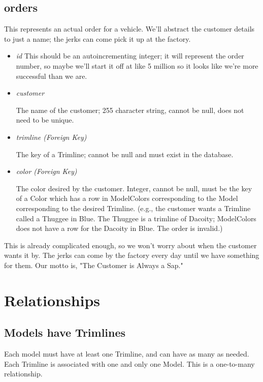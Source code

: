 \documentclass[11pt,letterpaper,oneside]{amsart}
\begin{document}
\subsection*{orders}

This represents an actual order for a vehicle.  We'll abstract the customer details to just a name; the jerks can come pick it up at the factory.

\begin{itemize}

\item \emph{id}
	This should be an autoincrementing integer; it will represent the order number, so maybe we'll start it off at like 5 million so it looks like we're more successful than we are.

\item \emph{customer}

	The name of the customer; 255 character string, cannot be null, does not need to be unique.
	
\item \emph{trimline (Foreign Key)}
	
	The key of a Trimline; cannot be null and must exist in the database.
	
\item \emph{color (Foreign Key)}

	The color desired by the customer.  Integer, cannot be null, must be the key of a Color which has a row in ModelColors corresponding to the Model corresponding to the desired Trimline.  (e.g., the customer wants a Trimline called a Thuggee in Blue.  The Thuggee is a trimline of Dacoity; ModelColors does not have a row for the Dacoity in Blue.  The order is invalid.)
	
\end{itemize}

This is already complicated enough, so we won't worry about when the customer wants it by.  The jerks can come by the factory every day until we have something for them.  Our motto is, "The Customer is Always a Sap."

\section*{Relationships}

\subsection*{Models have Trimlines}

Each model must have at least one Trimline, and can have as many as needed.  Each Trimline is associated with one and only one Model. This is a one-to-many relationship.
\end{document}
